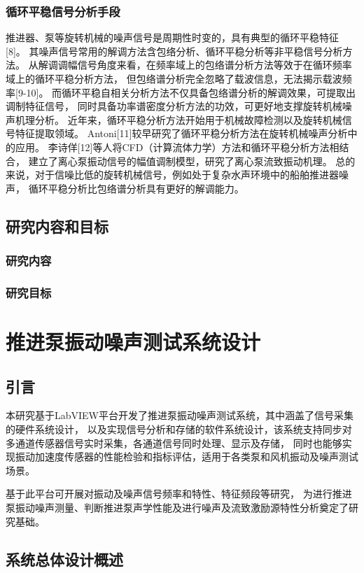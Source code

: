 \subsection{循环平稳信号分析手段}
推进器、泵等旋转机械的噪声信号是周期性时变的，具有典型的循环平稳特征[8]。
其噪声信号常用的解调方法含包络分析、循环平稳分析等非平稳信号分析方法。
从解调调幅信号角度来看，在频率域上的包络谱分析方法等效于在循环频率域上的循环平稳分析方法，
但包络谱分析完全忽略了载波信息，无法揭示载波频率[9-10]。
而循环平稳自相关分析方法不仅具备包络谱分析的解调效果，可提取出调制特征信号，
同时具备功率谱密度分析方法的功效，可更好地支撑旋转机械噪声机理分析。
近年来，循环平稳分析方法开始用于机械故障检测以及旋转机械信号特征提取领域。
Antoni[11]较早研究了循环平稳分析方法在旋转机械噪声分析中的应用。
李诗佯[12]等人将CFD（计算流体力学）方法和循环平稳分析方法相结合，
建立了离心泵振动信号的幅值调制模型，研究了离心泵流致振动机理。
总的来说，对于信噪比低的旋转机械信号，例如处于复杂水声环境中的船舶推进器噪声，
循环平稳分析比包络谱分析具有更好的解调能力。

\section{研究内容和目标}
\subsection{研究内容}
\subsection{研究目标}

\chapter{推进泵振动噪声测试系统设计}
\section{引言}
本研究基于LabVIEW平台开发了推进泵振动噪声测试系统，其中涵盖了信号采集的硬件系统设计，
以及实现信号分析和存储的软件系统设计，该系统支持同步对多通道传感器信号实时采集，各通道信号同时处理、显示及存储，
同时也能够实现振动加速度传感器的性能检验和指标评估，适用于各类泵和风机振动及噪声测试场景。

基于此平台可开展对振动及噪声信号频率和特性、特征频段等研究，
为进行推进泵振动噪声测量、判断推进泵声学性能及进行噪声及流致激励源特性分析奠定了研究基础。

\section{系统总体设计概述}
